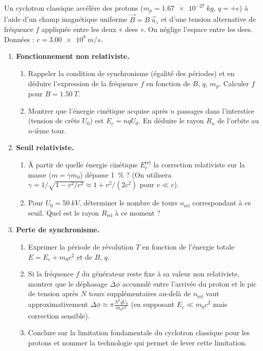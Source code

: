 \documentclass[11pt]{article}
\begin{document}
\begin{exercice}
Un cyclotron classique accélère des protons ($m_p = \SI{1.67e-27}{kg}$, $q = +e$) à l'aide d'un champ magnétique uniforme $\vec{B} = B\,\vec{u}_z$ et d'une tension alternative de fréquence $f$ appliquée entre les deux « dees ». On néglige l'espace entre les dees.
Données : $c = \SI{3.00e8}{m/s}$.

\begin{enumerate}
    \item \textbf{Fonctionnement non relativiste.} 
    \begin{enumerate}
        \item Rappeler la condition de synchronisme (égalité des périodes) et en déduire l'expression de la fréquence $f$ en fonction de $B$, $q$, $m_p$. Calculer $f$ pour $B = \SI{1.50}{T}$.
        \item Montrer que l'énergie cinétique acquise après $n$ passages dans l'interstice (tension de crête $U_0$) est $E_c = n q U_0$. En déduire le rayon $R_n$ de l'orbite au $n$-ième tour.
    \end{enumerate}
    \item \textbf{Seuil relativiste.} 
    \begin{enumerate}
        \item À partir de quelle énergie cinétique $E_c^{\text{rel}}$ la correction relativiste sur la masse ($m = \gamma m_0$) dépasse \SI{1}{\%} ? (On utilisera $\gamma = 1/\sqrt{1-v^2/c^2} \approx 1 + v^2/(2c^2)$ pour $v \ll c$).
        \item Pour $U_0 = \SI{50}{kV}$, déterminer le nombre de tours $n_{\text{rel}}$ correspondant à ce seuil. Quel est le rayon $R_{\text{rel}}$ à ce moment ?
    \end{enumerate}
    \item \textbf{Perte de synchronisme.} 
    \begin{enumerate}
        \item Exprimer la période de révolution $T$ en fonction de l'énergie totale $E = E_c + m_0c^2$ et de $B$, $q$.
        \item Si la fréquence $f$ du générateur reste fixe à sa valeur non relativiste, montrer que le déphasage $\Delta \phi$ accumulé entre l'arrivée du proton et le pic de tension après $N$ tours supplémentaires au-delà de $n_{\text{rel}}$ vaut approximativement $\Delta \phi \approx \pi \frac{N^2 q U_0}{m_0 c^2}$ (en supposant $E_c \ll m_0c^2$ mais correction sensible).
        \item Conclure sur la limitation fondamentale du cyclotron classique pour les protons et nommer la technologie qui permet de lever cette limitation.
    \end{enumerate}
\end{enumerate}
\end{exercice}
\end{document}

